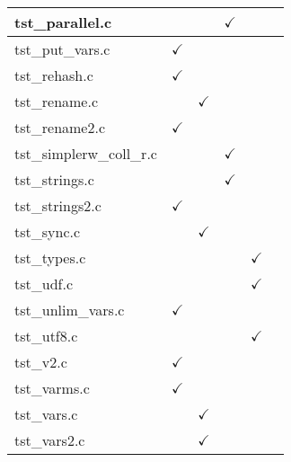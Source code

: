 \begin{table}[H]
\begin{tabular}{|l|c|c|c|c|c|}
tst\_parallel.c         &               &               & $\checkmark$  &               &               \\ \hline
tst\_put\_vars.c        & $\checkmark$  &               &               &               &               \\ \hline
tst\_rehash.c           & $\checkmark$  &               &               &               &               \\ \hline
tst\_rename.c           &               & $\checkmark$  &               &               &               \\ \hline
tst\_rename2.c          & $\checkmark$  &               &               &               &               \\ \hline
tst\_simplerw\_coll\_r.c   &            &               & $\checkmark$  &               &               \\ \hline
tst\_strings.c          &               &               & $\checkmark$  &               &               \\ \hline
tst\_strings2.c         & $\checkmark$  &               &               &               &               \\ \hline
tst\_sync.c             &               & $\checkmark$  &               &               &               \\ \hline
tst\_types.c            &               &               &               & $\checkmark$  &               \\ \hline
tst\_udf.c              &               &               &               & $\checkmark$  &               \\ \hline
tst\_unlim\_vars.c      & $\checkmark$  &               &               &               &               \\ \hline
tst\_utf8.c             &               &               &               & $\checkmark$  &               \\ \hline
tst\_v2.c               & $\checkmark$  &               &               &               &               \\ \hline
tst\_varms.c            & $\checkmark$  &               &               &               &               \\ \hline
tst\_vars.c             &               & $\checkmark$  &               &               &               \\ \hline
tst\_vars2.c            &               & $\checkmark$  &               &               &               \\ \hline

\end{tabular}
\end{table}
